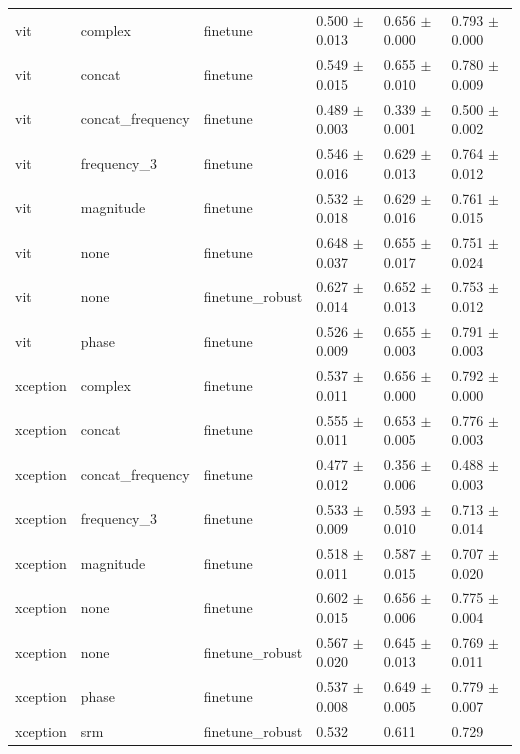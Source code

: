 \begin{table}
\begin{tabular}{llllll}
vit & complex & finetune & 0.500 $\pm$ 0.013 & 0.656 $\pm$ 0.000 & 0.793 $\pm$ 0.000 \\
vit & concat & finetune & 0.549 $\pm$ 0.015 & 0.655 $\pm$ 0.010 & 0.780 $\pm$ 0.009 \\
vit & concat_frequency & finetune & 0.489 $\pm$ 0.003 & 0.339 $\pm$ 0.001 & 0.500 $\pm$ 0.002 \\
vit & frequency_3 & finetune & 0.546 $\pm$ 0.016 & 0.629 $\pm$ 0.013 & 0.764 $\pm$ 0.012 \\
vit & magnitude & finetune & 0.532 $\pm$ 0.018 & 0.629 $\pm$ 0.016 & 0.761 $\pm$ 0.015 \\
vit & none & finetune & 0.648 $\pm$ 0.037 & 0.655 $\pm$ 0.017 & 0.751 $\pm$ 0.024 \\
vit & none & finetune_robust & 0.627 $\pm$ 0.014 & 0.652 $\pm$ 0.013 & 0.753 $\pm$ 0.012 \\
vit & phase & finetune & 0.526 $\pm$ 0.009 & 0.655 $\pm$ 0.003 & 0.791 $\pm$ 0.003 \\
xception & complex & finetune & 0.537 $\pm$ 0.011 & 0.656 $\pm$ 0.000 & 0.792 $\pm$ 0.000 \\
xception & concat & finetune & 0.555 $\pm$ 0.011 & 0.653 $\pm$ 0.005 & 0.776 $\pm$ 0.003 \\
xception & concat_frequency & finetune & 0.477 $\pm$ 0.012 & 0.356 $\pm$ 0.006 & 0.488 $\pm$ 0.003 \\
xception & frequency_3 & finetune & 0.533 $\pm$ 0.009 & 0.593 $\pm$ 0.010 & 0.713 $\pm$ 0.014 \\
xception & magnitude & finetune & 0.518 $\pm$ 0.011 & 0.587 $\pm$ 0.015 & 0.707 $\pm$ 0.020 \\
xception & none & finetune & 0.602 $\pm$ 0.015 & 0.656 $\pm$ 0.006 & 0.775 $\pm$ 0.004 \\
xception & none & finetune_robust & 0.567 $\pm$ 0.020 & 0.645 $\pm$ 0.013 & 0.769 $\pm$ 0.011 \\
xception & phase & finetune & 0.537 $\pm$ 0.008 & 0.649 $\pm$ 0.005 & 0.779 $\pm$ 0.007 \\
xception & srm & finetune_robust & 0.532 & 0.611 & 0.729 \\
\bottomrule
\end{tabular}
\end{table}


